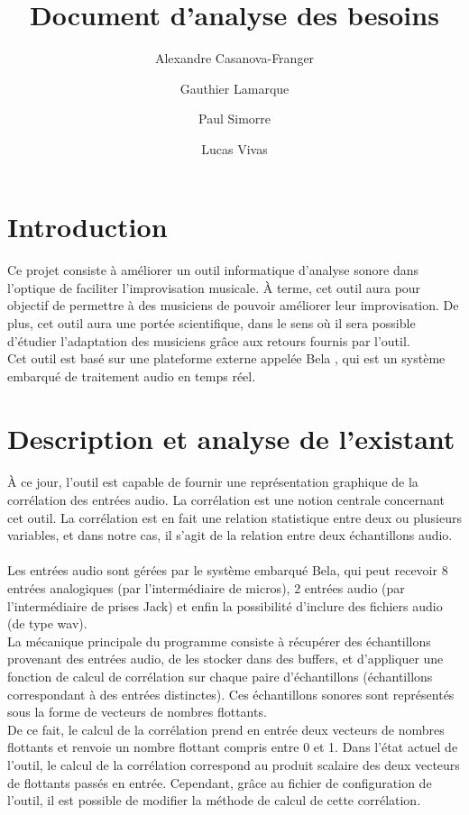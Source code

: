 \documentclass{article}
\title{Document d'analyse des besoins}
\author{Alexandre Casanova-Franger\\
        \and
        Gauthier Lamarque\\
        \and
        Paul Simorre\\
        \and
        Lucas Vivas\\}
\begin{document}
  \maketitle
  \section{Introduction}
    \paragraph{}
    Ce projet consiste à améliorer un outil informatique d'analyse sonore dans
    l'optique de faciliter l'improvisation musicale. À terme, cet outil aura pour
    objectif de permettre à des musiciens de pouvoir améliorer leur
    improvisation. De plus, cet outil aura une portée scientifique, dans le sens
    où il sera possible d'étudier l'adaptation des musiciens grâce aux retours
    fournis par l'outil. \\
    Cet outil est basé sur une plateforme externe appelée Bela \cite{BELA},
    qui est un système embarqué de traitement audio en temps réel.
  \section{Description et analyse de l'existant}
    \paragraph{}
    À ce jour, l'outil est capable de fournir une représentation graphique de la
    corrélation des entrées audio. La corrélation est une notion centrale
    concernant cet outil. La corrélation est en fait une relation statistique
    entre deux ou plusieurs variables, et dans notre cas, il s'agit de la
    relation entre deux échantillons audio.
    \paragraph{}
    Les entrées audio sont gérées par le système embarqué Bela, qui peut
    recevoir 8 entrées analogiques (par l'intermédiaire de micros), 2 entrées
    audio (par l'intermédiaire de prises Jack) et enfin la possibilité d'inclure
    des fichiers audio (de type wav).\\
    La mécanique principale du programme consiste à récupérer des échantillons
    provenant des entrées audio, de les stocker dans des buffers, et d'appliquer
    une fonction de calcul de corrélation sur chaque paire d'échantillons
    (échantillons correspondant à des entrées distinctes). Ces échantillons
    sonores sont représentés sous la forme de vecteurs de nombres flottants.\\
    De ce fait, le calcul de la corrélation prend en entrée deux vecteurs de
    nombres flottants et renvoie un nombre flottant compris entre 0 et 1.
    Dans l'état actuel de l'outil, le calcul de la corrélation correspond au
    produit scalaire des deux vecteurs de flottants passés en entrée. Cependant,
    grâce au fichier de configuration de l'outil, il est possible de modifier la
    méthode de calcul de cette corrélation.
\end{document}
